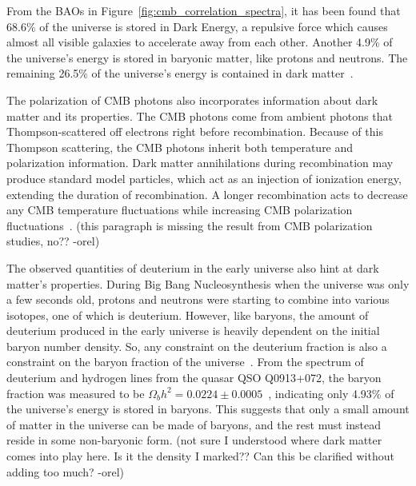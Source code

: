From the BAOs in Figure~\ref{fig:cmb_correlation_spectra}, it has been found that 68.6\% of the universe is stored in Dark Energy, a repulsive force which causes almost all visible galaxies to accelerate away from each other.
Another 4.9\% of the universe's energy is stored in baryonic matter, like protons and neutrons.
The remaining 26.5\% of the universe's energy is contained in dark matter~\cite{planck2015}.

The polarization of CMB photons also incorporates information about dark matter and its properties.
The CMB photons come from ambient photons that Thompson-scattered off electrons right before recombination.
Because of this Thompson scattering, the CMB photons inherit both temperature and polarization information.
Dark matter annihilations during recombination may produce standard model particles, which act as an injection of ionization energy, extending the duration of recombination.
A longer recombination acts to decrease any CMB temperature fluctuations while increasing CMB polarization fluctuations~\cite{cmb_polarization1,cmb_polarization2}.
{\color{red}(this paragraph is missing the result from CMB polarization studies, no?? -orel)}

The observed quantities of deuterium in the early universe also hint at dark matter's properties.
During Big Bang Nucleosynthesis when the universe was only a few seconds old, protons and neutrons were starting to combine into various isotopes, one of which is deuterium.
However, like baryons, the amount of deuterium produced in the early universe is heavily dependent on the initial baryon number density.
So, any constraint on the deuterium fraction is also a constraint on the baryon fraction of the universe~\cite{deuterium1,deuterium2}.
From the spectrum of deuterium and hydrogen lines from the quasar QSO Q0913+072, the baryon fraction was measured to be $\Omega_{b}h^2 = 0.0224 \pm 0.0005$~\cite{deuterium3}, indicating only 4.93\% of the universe's energy is stored in baryons.
This suggests that only a small amount of matter in the universe can be made of baryons, and the rest must instead reside in some non-baryonic form.
{\color{red}(not sure I understood where dark matter comes into play here.  Is it the density I marked?? Can this be clarified without adding too much? -orel)}

